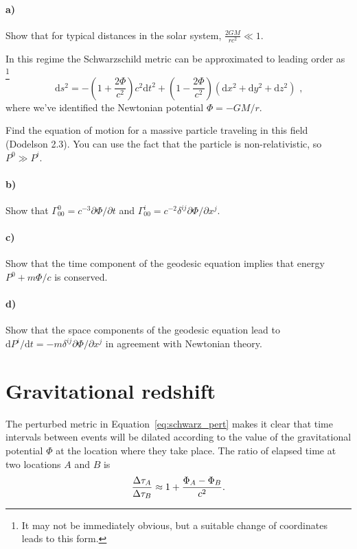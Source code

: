 \documentclass[12pt]{article}
\newcommand\diff{\mathrm{d}}
\begin{document}
\paragraph{a)} Show that for typical distances in the solar system, $\frac{2 G
M}{r c^2} \ll 1$.

In this regime the Schwarzschild metric can be approximated to leading order as
\footnote{It may not be immediately obvious, but a suitable change of coordinates leads to this form.}
\begin{equation}
    \diff s^2 = - \left(1 + \frac{2 \Phi}{c^2}\right) c^2 \diff t^2
    + \left(1 - \frac{2 \Phi}{c^2}\right)
    (\diff x^2 + \diff y^2 + \diff z^2) \text{ ,}
\label{eq:schwarz_pert}
\end{equation}
where we've identified the Newtonian potential $\Phi = -GM/r$.

Find the equation of motion for a massive particle traveling in this field
(Dodelson 2.3). You can use the fact that the particle is non-relativistic, so
$P^0 \gg P^i$.

\paragraph{b)} Show that $\Gamma^0_{00} = c^{-3} \partial \Phi / \partial t$ and
$\Gamma^i_{00} = c^{-2} \delta^{ij} \partial \Phi / \partial x^j$.

\paragraph{c)} Show that the time component of the geodesic equation implies
that energy $P^0 + m \Phi / c$ is conserved.

\paragraph{d)} Show that the space components of the geodesic equation lead to
$\diff P^i / \diff t = - m \delta^{ij} \partial \Phi / \partial x^j$ in
agreement with Newtonian theory.

\section{Gravitational redshift}

The perturbed metric in Equation~\ref{eq:schwarz_pert} makes it clear that time
intervals between events will be dilated according to the value of the
gravitational potential $\Phi$ at the location where they take place. The ratio
of elapsed time at two locations $A$ and $B$ is
\begin{equation}
    \frac{\Delta \tau_A}{\Delta \tau_B} \approx 1 + \frac{\Phi_A - \Phi_B}{c^2} \text.
\end{equation}
\end{document}
